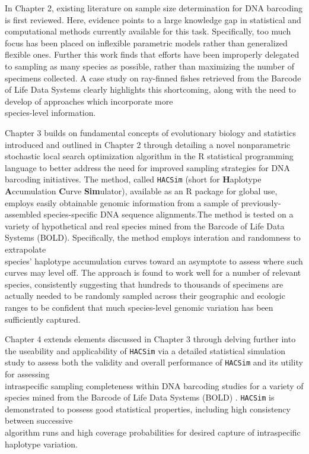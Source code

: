 \vspace{5mm}

In Chapter 2, existing literature on sample size determination for DNA barcoding is first reviewed. Here, evidence points to a large knowledge gap in statistical and computational methods currently available for this task. Specifically, too much focus has been placed on inflexible parametric models rather than generalized flexible ones. Further this work finds that efforts have been improperly delegated to sampling as many species as possible, rather than maximizing the number of specimens collected. A case study on ray-finned fishes retrieved from the Barcode of Life Data Systems \cite{ratnasingham2007bold} clearly highlights this shortcoming, along with the need to develop of approaches which incorporate more \\ species-level information. 

\vspace{5mm}

Chapter 3 builds on fundamental concepts of evolutionary biology and statistics \\ introduced and outlined in Chapter 2 through detailing a novel nonparametric stochastic local search optimization algorithm in the R statistical programming language to better address the need for improved sampling strategies for DNA barcoding initiatives. The method, called {\tt HACSim} (short for \textbf{H}aplotype \textbf{A}ccumulation \textbf{C}urve \textbf{Sim}ulator), available as an R package for global use, employs easily obtainable genomic information from a sample of previously-assembled species-specific DNA sequence alignments.The method is tested on a variety of hypothetical and real species mined from the Barcode of Life Data Systems (BOLD). Specifically, the method employs interation and randomness to extrapolate \\ species' haplotype accumulation curves toward an asymptote to assess where such curves may level off. The approach is found to work well for a number of relevant species, consistently suggesting that hundreds to thousands of specimens are actually needed to be randomly sampled across their geographic and ecologic ranges to be confident that much species-level genomic variation has been sufficiently captured.  


\vspace{5mm}

Chapter 4 extends elements discussed in Chapter 3 through delving further into the useability and applicability of {\tt HACSim} via a detailed statistical simulation study to assess both the validity and overall performance of {\tt HACSim} and its utility for assessing \\ intraspecific sampling completeness within DNA barcoding studies for a variety of species mined from the Barcode of Life Data Systems (BOLD) \cite{ratnasingham2007bold}. {\tt HACSim} is demonstrated to possess good statistical properties, including high consistency between successive 
\\ algorithm runs and high coverage probabilities for desired capture of intraspecific \\ haplotype variation.

